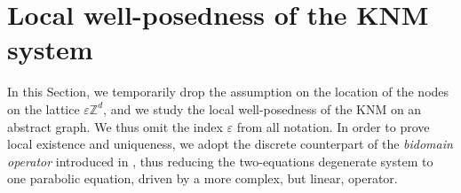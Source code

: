 \documentclass[a4paper,11pt]{article}
\theoremstyle{definition}
\numberwithin{equation}{section}
\newcommand{\e}{\varepsilon}
\begin{document}

\section{Local well-posedness of the KNM system}
\label{sec:notation}
In this Section, we temporarily drop the assumption on the location of the nodes on the lattice $\e \mathbb{Z}^d$, and we study the local well-posedness of the KNM on an abstract graph. We thus omit the index $\e$ from all notation. In order to prove local existence and uniqueness, we adopt the discrete counterpart of the \textit{bidomain operator} introduced in \cite{BCP09}, thus reducing the two-equations degenerate system to one parabolic equation, driven by a more complex, but linear, operator.
\end{document}
